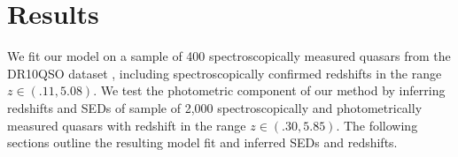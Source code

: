 \documentclass{article}
\begin{document}
\section{Results}
\label{sec:experiments}
We fit our model on a sample of 400 spectroscopically measured quasars from the DR10QSO dataset \cite{paris2014sloan}, including spectroscopically confirmed redshifts in the range $z \in (.11,  5.08)$.  
We test the photometric component of our method by inferring redshifts and SEDs of sample of 2,000 spectroscopically and photometrically measured quasars with redshift in the range $z \in (.30, 5.85)$.  
The following sections outline the resulting model fit and inferred SEDs and redshifts. 
\end{document}
